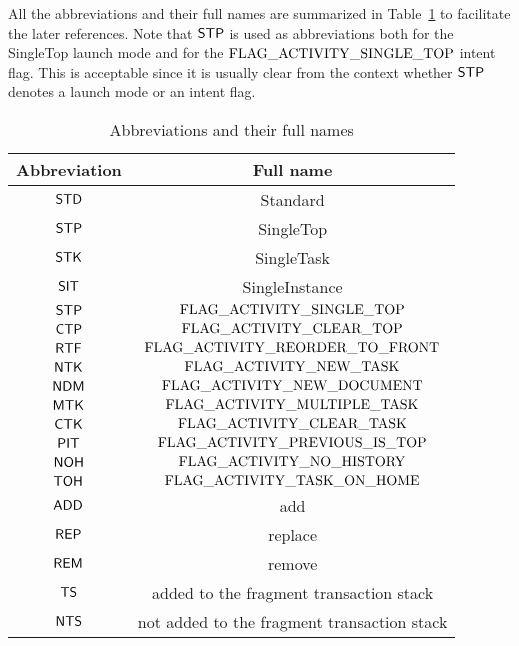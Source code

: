 All the abbreviations and their full names are summarized in Table~\ref{tab-abr-full} to facilitate the later references. Note that ${\sf STP}$ is used as abbreviations both for the SingleTop launch mode and for the $\rm FLAG\_ACTIVITY\_SINGLE\_TOP$ intent flag. This is acceptable since it is usually clear from the context whether ${\sf STP}$ denotes a launch mode or an intent flag.


\begin{table}[htbp]
    \centering
    \begin{tabular}{| c | c |}
    \hline
    \textbf{Abbreviation}  & \textbf{Full name} \\
    \hline
    ${\sf STD}$ & Standard  \\
    \hline
    ${\sf STP}$ & SingleTop \\
    \hline
    ${\sf STK}$ & SingleTask \\
    \hline
    ${\sf SIT}$  & SingleInstance \\
    \hline
    ${\sf STP}$ & $\rm FLAG\_ACTIVITY\_SINGLE\_TOP$\\
    \hline
    ${\sf CTP}$ &  $\rm FLAG\_ACTIVITY\_CLEAR\_TOP$ \\
    \hline
    ${\sf RTF}$ & $\rm FLAG\_ACTIVITY\_REORDER\_TO\_FRONT$ \\
    \hline
    ${\sf NTK}$ & $\rm FLAG\_ACTIVITY\_NEW\_TASK$ \\
    \hline
    ${\sf NDM}$ & $\rm FLAG\_ACTIVITY\_NEW\_DOCUMENT$\\
    \hline
    ${\sf MTK}$ & $\rm FLAG\_ACTIVITY\_MULTIPLE\_TASK$  \\
    \hline
    ${\sf CTK}$ & $\rm FLAG\_ACTIVITY\_CLEAR\_TASK$  \\
    \hline
    ${\sf PIT}$ & $\rm FLAG\_ACTIVITY\_PREVIOUS\_IS\_TOP$ \\
    \hline
    ${\sf NOH}$ & $\rm FLAG\_ACTIVITY\_NO\_HISTORY$ \\
    \hline
    ${\sf TOH}$ &$\rm FLAG\_ACTIVITY\_TASK\_ON\_HOME$ \\
    \hline
    $\mathsf{ADD}$ & add \\
    \hline
    $\mathsf{REP}$ & replace \\
    \hline
    $\mathsf{REM}$ & remove \\
    \hline
    ${\sf TS}$ & added to the fragment transaction stack \\
    \hline
    ${\sf NTS}$ & not added to the fragment transaction stack \\
    \hline
    \end{tabular}
    \caption{Abbreviations and their full names}
    \label{tab-abr-full}
\end{table}



